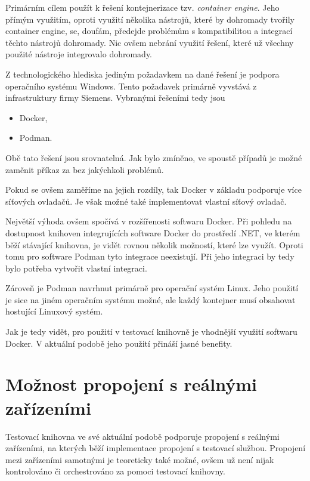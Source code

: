 Primárním cílem použít k řešení kontejnerizace tzv. \textit{container engine}. Jeho přímým využitím, oproti využití několika nástrojů, které by dohromady tvořily container engine, se, doufám, předejde problémům s kompatibilitou a integrací těchto nástrojů dohromady. Nic ovšem nebrání využití řešení, které už všechny použité nástroje integrovalo dohromady.

Z technologického hlediska jediným požadavkem na dané řešení je podpora operačního systému Windows. Tento požadavek primárně vyvstává z infrastruktury firmy Siemens. Vybranými řešeními tedy jsou

\begin{itemize}
    \item Docker,
    \item Podman.
\end{itemize}

Obě tato řešení jsou srovnatelná. Jak bylo zmíněno, ve spoustě případů je možné zaměnit příkaz  za  bez jakýchkoli problémů. 

Pokud se ovšem zaměříme na jejich rozdíly, tak Docker v základu podporuje více síťových ovladačů. Je však možné také implementovat vlastní síťový ovladač.\,\cite{docker_networking_overview}

Největší výhoda ovšem spočívá v rozšířenosti softwaru Docker. Při pohledu na dostupnost knihoven integrujících software Docker do prostředí .NET, ve kterém běží stávající knihovna, je vidět rovnou několik možností, které lze využít. Oproti tomu pro software Podman tyto integrace neexistují. Při jeho integraci by tedy bylo potřeba vytvořit vlastní integraci. 

Zároveň je Podman navrhnut primárně pro operační systém Linux. Jeho použití je sice na jiném operačním systému možné, ale každý kontejner musí obsahovat hostující Linuxový systém. 

Jak je tedy vidět, pro použití v testovací knihovně je vhodnější využití softwaru Docker. V aktuální podobě jeho použití přináší jasné benefity. 


\section{Možnost propojení s reálnými zařízeními}

Testovací knihovna ve své aktuální podobě podporuje propojení s reálnými zařízeními, na kterých běží implementace propojení s testovací službou. Propojení mezi zařízeními samotnými je teoreticky také možné, ovšem už není nijak kontrolováno či orchestrováno za pomoci testovací knihovny. 


